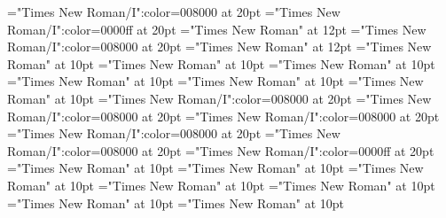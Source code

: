 \documentclass[a4paper]{article}
\begin{document}
 
\pagestyle{plain} 
\font\pronunciationenUSpronunciationarticlebefore="Times New Roman/I":color=008000 at 20pt
\font\pronunciationenUKpronunciationenUSbefore="Times New Roman/I":color=0000ff at 20pt
\font\pronunciationenUSfirstoftypebefore="Times New Roman" at 12pt
\font\pronunciationenUSpronunciationbefore="Times New Roman/I":color=008000 at 20pt
\font\pronunciationenUSbefore="Times New Roman" at 12pt
\font\sectionletterdictionary="Times New Roman" at 10pt
\font\headsectionletterdictionary="Times New Roman" at 10pt
\font\articledictionary="Times New Roman" at 10pt
\font\firstoftypeheadwordlastoftypearticledictionary="Times New Roman" at 10pt
\font\firstoftypegrammarrequireslastoftypearticledictionary="Times New Roman" at 10pt
\font\firstoftypelastoftyperelationsynonymarticledictionary="Times New Roman" at 10pt
\font\firstoftypepronunciationenUKarticledictionary="Times New Roman/I":color=008000 at 20pt
\font\pronunciationfirstoftypebeforearticledictionary="Times New Roman/I":color=008000 at 20pt
\font\firstoftypepronunciationenUSarticledictionary="Times New Roman/I":color=008000 at 20pt
\font\pronunciationenUSfirstoftypebeforearticledictionary="Times New Roman/I":color=008000 at 20pt
\font\lastoftypepronunciationenUKarticledictionary="Times New Roman/I":color=008000 at 20pt
\font\pronunciationenUKpronunciationenUSbeforearticledictionary="Times New Roman/I":color=0000ff at 20pt
\font\firstoftypegrammarcategorylastoftypearticledictionary="Times New Roman" at 10pt
\font{}="Times New Roman" at 10pt
\font\firstoftypelastoftypenotearticledictionary="Times New Roman" at 10pt
\font\exampleusefirstoftypearticledictionary="Times New Roman" at 10pt
\font\examplefirstoftypearticledictionary="Times New Roman" at 10pt
\font\exampleuselastoftypearticledictionary="Times New Roman" at 10pt
\font\examplelastoftypearticledictionary="Times New Roman" at 10pt

\pagestyle{fancy} 


\end{document}

